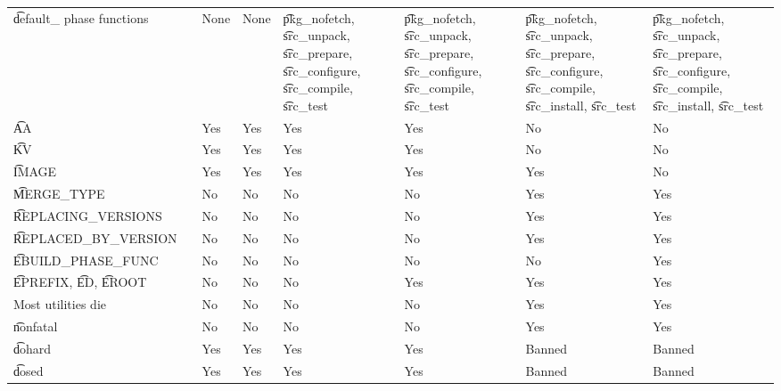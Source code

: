 \begin{landscape}
\begin{longtable}{llP{5em}P{5em}P{6em}P{6em}P{6em}P{6em}}
\t{default\_} phase functions &  &
    None & None &
    \t{pkg\_nofetch}, \t{src\_unpack}, \t{src\_prepare}, \t{src\_configure}, \t{src\_compile}, \t{src\_test} &
    \t{pkg\_nofetch}, \t{src\_unpack}, \t{src\_prepare}, \t{src\_configure}, \t{src\_compile}, \t{src\_test} &
    \t{pkg\_nofetch}, \t{src\_unpack}, \t{src\_prepare}, \t{src\_configure},
        \t{src\_compile}, \t{src\_install}, \t{src\_test} &
    \t{pkg\_nofetch}, \t{src\_unpack}, \t{src\_prepare}, \t{src\_configure},
        \t{src\_compile}, \t{src\_install}, \t{src\_test} \\

\t{AA} &  &
    Yes & Yes & Yes & Yes & No & No \\

\t{KV} &  &
    Yes & Yes & Yes & Yes & No & No \\

\t{IMAGE} &  &
    Yes & Yes & Yes & Yes & Yes & No \\

\t{MERGE\_TYPE} &  &
    No & No & No & No & Yes & Yes \\

\t{REPLACING\_VERSIONS} &  &
    No & No & No & No & Yes & Yes \\

\t{REPLACED\_BY\_VERSION} &  &
    No & No & No & No & Yes & Yes \\

\t{EBUILD\_PHASE\_FUNC} &  &
    No & No & No & No & No & Yes \\

\t{EPREFIX}, \t{ED}, \t{EROOT} &  &
    No & No & No & Yes & Yes & Yes \\

Most utilities die &  &
    No & No & No & No & Yes & Yes \\

\t{nonfatal} &  &
    No & No & No & No & Yes & Yes \\

\t{dohard} &  &
    Yes & Yes & Yes & Yes & Banned & Banned \\

\t{dosed} &  &
    Yes & Yes & Yes & Yes & Banned & Banned \\


\end{longtable}
\end{landscape}
